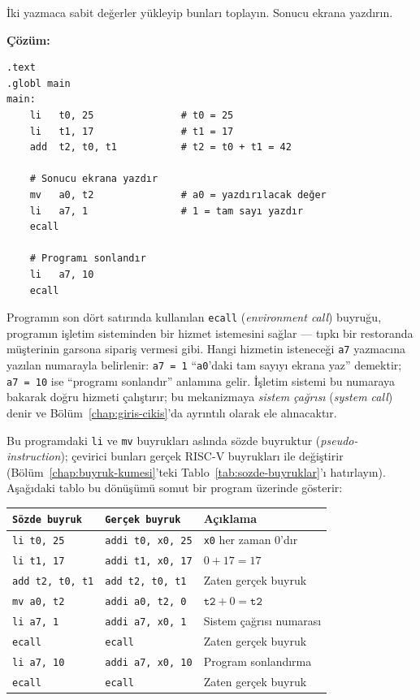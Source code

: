 \begin{ornek}[4.1]
\label{orn:iki-yazmac-topla}
İki yazmaca sabit değerler yükleyip bunları toplayın. Sonucu ekrana yazdırın.

\textbf{Çözüm:}

\begin{lstlisting}[style=riscv]
.text
.globl main
main:
    li   t0, 25               # t0 = 25
    li   t1, 17               # t1 = 17
    add  t2, t0, t1           # t2 = t0 + t1 = 42

    # Sonucu ekrana yazdır
    mv   a0, t2               # a0 = yazdırılacak değer
    li   a7, 1                # 1 = tam sayı yazdır
    ecall

    # Programı sonlandır
    li   a7, 10
    ecall
\end{lstlisting}

Programın son dört satırında kullanılan \texttt{ecall} (\emph{environment call}) buyruğu, programın işletim sisteminden bir hizmet istemesini sağlar --- tıpkı bir restoranda müşterinin garsona sipariş vermesi gibi. Hangi hizmetin isteneceği \texttt{a7} yazmacına yazılan numarayla belirlenir: \texttt{a7\,=\,1} ``\texttt{a0}'daki tam sayıyı ekrana yaz'' demektir; \texttt{a7\,=\,10} ise ``programı sonlandır'' anlamına gelir. İşletim sistemi bu numaraya bakarak doğru hizmeti çalıştırır; bu mekanizmaya \emph{sistem çağrısı} (\emph{system call}) denir ve Bölüm~\ref{chap:giris-cikis}'da ayrıntılı olarak ele alınacaktır.

Bu programdaki \texttt{li} ve \texttt{mv} buyrukları aslında sözde buyruktur (\emph{pseudo-instruction}); çevirici bunları gerçek RISC-V buyrukları ile değiştirir (Bölüm~\ref{chap:buyruk-kumesi}'teki Tablo~\ref{tab:sozde-buyruklar}'ı hatırlayın). Aşağıdaki tablo bu dönüşümü somut bir program üzerinde gösterir:

\begin{center}
\small
\begin{tabular}{lll}
\toprule
\texttt{Sözde buyruk} & \texttt{Gerçek buyruk} & Açıklama \\
\midrule
\texttt{li t0, 25}  & \texttt{addi t0, x0, 25} & \texttt{x0} her zaman 0'dır \\
\texttt{li t1, 17}  & \texttt{addi t1, x0, 17} & $0 + 17 = 17$ \\
\texttt{add t2, t0, t1} & \texttt{add t2, t0, t1} & Zaten gerçek buyruk \\
\texttt{mv a0, t2}  & \texttt{addi a0, t2, 0}  & $\texttt{t2} + 0 = \texttt{t2}$ \\
\texttt{li a7, 1}   & \texttt{addi a7, x0, 1}  & Sistem çağrısı numarası \\
\texttt{ecall}       & \texttt{ecall}            & Zaten gerçek buyruk \\
\texttt{li a7, 10}  & \texttt{addi a7, x0, 10} & Program sonlandırma \\
\texttt{ecall}       & \texttt{ecall}            & Zaten gerçek buyruk \\
\bottomrule
\end{tabular}


\end{center}
\end{ornek}
